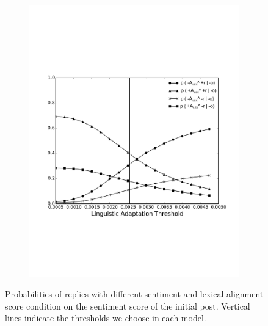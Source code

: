 \documentclass[man,biblatex,floatsintext]{apa6}
\newcommand{\up}{\vspace*{-12pt}}
\begin{document}
\begin{figure}[!htb]
\begin{subfigure}{.5\textwidth}
  \includegraphics[width=\linewidth]{Figures/LexAnegi_new_rob_New_Enlarge.pdf}
  \caption{\label{fig:ProbLexNego}}   
\end{subfigure}%
\caption{Probabilities of replies with different sentiment and lexical alignment score condition on the sentiment score of the initial post. Vertical lines indicate the thresholds we choose in each model.}
\label{fig:Probability_Change_Lex}
\up
\end{figure}
\end{document}
